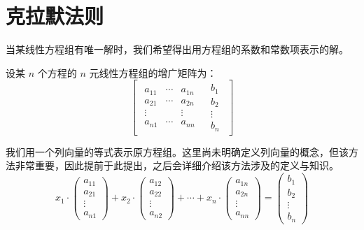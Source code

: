 
\section{克拉默法则}

当某线性方程组有唯一解时，我们希望得出用方程组的系数和常数项表示的解。

设某 $n$ 个方程的 $n$ 元线性方程组的增广矩阵为：
$$
\left[\begin{array}{c|c}
	\begin{matrix}
		a_{11} & \cdots & a_{1n}
		\\
		a_{21} & \cdots & a_{2n}
		\\
		\vdots & & \vdots
		\\
		a_{n1} & \cdots & a_{nn}
	\end{matrix}
	&
	\begin{matrix}
		b_1 \\ b_2 \\ \vdots \\ b_n
	\end{matrix}
\end{array}\right]
$$

我们用一个列向量的等式表示原方程组。这里尚未明确定义列向量的概念，但该方法非常重要，因此提前于此提出，之后会详细介绍该方法涉及的定义与知识。
$$
x_1 \cdot \begin{pmatrix} a_{11} \\ a_{21} \\ \vdots \\ a_{n1} \end{pmatrix} +
x_2 \cdot \begin{pmatrix} a_{12} \\ a_{22} \\ \vdots \\ a_{n2} \end{pmatrix} +
\cdots +
x_n \cdot \begin{pmatrix} a_{1n} \\ a_{2n} \\ \vdots \\ a_{nn} \end{pmatrix} =
\begin{pmatrix} b_1 \\ b_2 \\ \vdots \\ b_n \end{pmatrix}
$$

